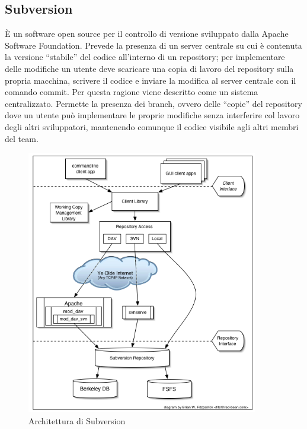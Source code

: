 \documentclass[a4paper, 12pt]{report}
\numberwithin{equation}{section}
\begin{document}
\subsection{Subversion}
È un software open source per il controllo di versione sviluppato dalla Apache Software Foundation. Prevede la presenza di un server centrale su cui è contenuta la versione “stabile” del codice all’interno di un repository; per implementare delle modifiche un utente deve scaricare una copia di lavoro del repository sulla propria macchina, scrivere il codice e inviare la modifica al server centrale con il comando commit. Per questa ragione viene descritto come un sistema centralizzato. Permette la presenza dei branch, ovvero delle “copie” del repository dove un utente può implementare le proprie modifiche senza interferire col lavoro degli altri sviluppatori, mantenendo comunque il codice visibile agli altri membri del team.
\begin{figure}
    \centering
    \includegraphics[width=0.9\textwidth]{imgs/subversion.png}
    \caption{Architettura di Subversion \cite{svn-docs}}
    \label{fig:subversion}
\end{figure}
\end{document}
